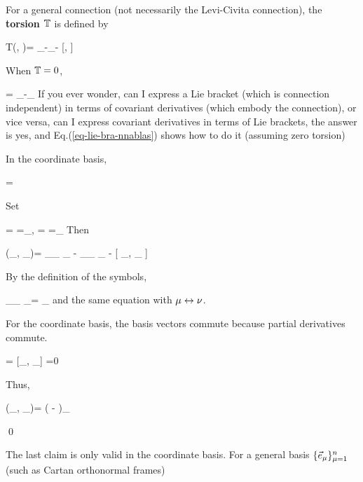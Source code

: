 For a general connection (not necessarily
the Levi-Civita connection), the {\bf torsion ${ \mathbb{T}}$}
is defined by

\beq
T(\vecX, \vecY)=
\nnabla_\vecX \vecY  -\nnabla_\vecY \vecX -
[\vecX, \vecY]
\eeq

When ${ \mathbb{T}}=0$, 

\beq
[\vecX, \vecY] =
\nnabla_\vecX \vecY  -\nnabla_\vecY \vecX
\label{eq-lie-bra-nnablas}
\eeq
If you ever wonder,
can I express a Lie bracket
(which is connection  independent)
in terms of covariant 
derivatives (which embody the connection),
or vice versa, 
can I express covariant derivatives in terms
of Lie brackets, the answer is yes,
and 
Eq.(\ref{eq-lie-bra-nnablas})
shows how to do it (assuming zero torsion) 



\begin{claim}
In the coordinate basis,

\beq
{}\quad \iff \quad
\Gamma\indices{^\rho_{\mu\nu}}
=
\Gamma\indices{^\rho_{\nu\mu}}
\eeq


\end{claim}
\proof

Set

\beq
\vecX = =\vecpartial_\mu,
\quad
\vecY=
=\vecpartial_\nu
\eeq
Then

\beq
\TT(\vecpartial_\mu,
\vecpartial_\nu)=
\nnabla_{\vecpartial_\mu}
\vec\partial_\nu
-
\nnabla_{\vecpartial_\nu}
\vecpartial_\mu
-
[
\vecpartial_\mu,
\vecpartial_\nu
]
\eeq

By the definition of
the \Chris symbols,

\beq
\nnabla_{\vecpartial_\mu}
\vecpartial_\nu = \Gamma\indices{^\rho_{\mu\nu}}\vecpartial_\rho
\eeq
and the same equation with $\mu\leftrightarrow \nu$.

For the coordinate basis, 
the basis vectors commute
because partial
derivatives  commute.

\beq
[
\vecpartial_\mu,
\vecpartial_\nu
]=
[\partial_\mu, \partial_\nu]
=0
\eeq

Thus,

\beq
\TT(\vecpartial_\mu,
\vecpartial_\nu)=
\left(
\Gamma\indices{^\rho_{\mu\nu}}-
\Gamma\indices{^\rho_{\nu\mu}}
\right)\vecpartial_\rho
\eeq

\qed




The last 
claim is only valid
in the coordinate basis.
For a general basis $\{{\vec{e}}_\mu\}_{\mu=1}^n$ (such
as Cartan orthonormal frames)

